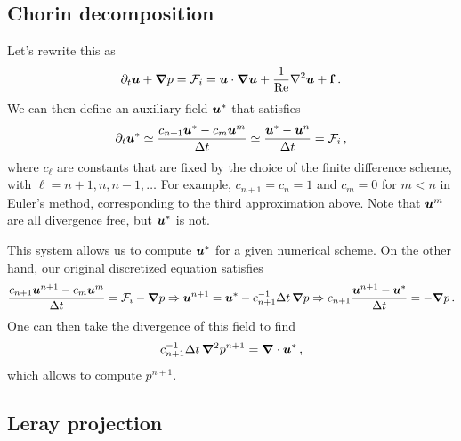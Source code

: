 \documentclass{article}
\begin{document}
\subsection{Chorin decomposition}

Let's rewrite this as \cite{Chorin1968Numerical}
\begin{equation}
    \partial_t \uu + \nab p = {\cal F}_i =  \uu \cdot \nab
    \uu + \frac{1}{\rm Re} \nabla^2 \uu + {\bf f}\,.
\end{equation}
We can then define an auxiliary field $\uu^\ast$
that satisfies
\begin{equation}
    \partial_t \uu^\ast \simeq \frac{c_{n+1}
    \uu^\ast - c_m \uu^m}{\Delta t}
    \simeq
    \frac{\uu^\ast - \uu^n}
    {\Delta t} = {\cal F}_i\,,
\end{equation}
where $c_\ell$ are constants that are fixed
by the choice of the finite difference
scheme, with $\ell = n + 1, n, n - 1, \dots$
For example, $c_{n + 1} = c_n = 1$ and $c_m = 0$ for $m < n$ in Euler's method,
corresponding to the third approximation above.
Note that $\uu^m$ are all divergence free, but $\uu^\ast$ is not.

This system allows us to compute $\uu^\ast$
for a given numerical scheme.
On the other hand, our original discretized
equation satisfies
\begin{equation}
    \frac{c_{n + 1} \uu^{n + 1} - c_m \uu^m}{\Delta t}
    = {\cal F}_i - \nab p \Rightarrow 
    \uu^{n + 1} = \uu^\ast - c^{-1}_{n + 1} \Delta t \,
    \nab p \Rightarrow 
    c_{n + 1} \frac{\uu^{n + 1} - \uu^\ast}{\Delta t}
    = - \nab p \,.
\end{equation}
One can then take the divergence of this 
field to find
\begin{equation}
    c^{-1}_{n + 1} \Delta t \, \nab^2 p^{n + 1}
    = \nab \cdot \uu^\ast \,,
\end{equation}
which allows to compute $p^{n+ 1}$.


\subsection{Leray projection}
\end{document}
